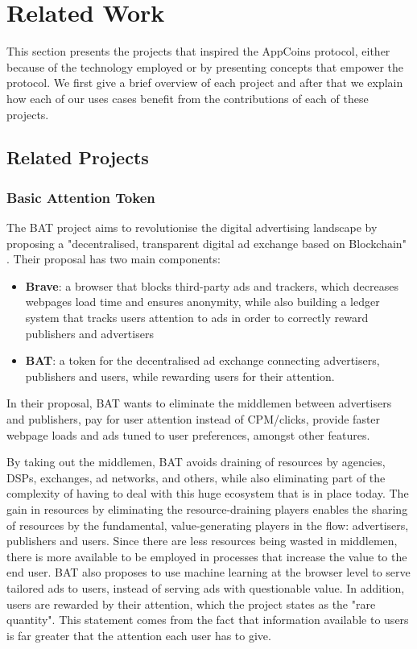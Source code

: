\section{Related Work}

\label{sec:related}

This section presents the projects that inspired the AppCoins protocol, either because of the technology employed or by presenting concepts that empower the protocol. We first give a brief overview of each project and after that we explain how each of our uses cases benefit from the contributions of each of these projects.

\subsection{Related Projects}

\subsubsection{Basic Attention Token}

The BAT project aims to revolutionise the digital advertising landscape by proposing a "decentralised, transparent digital ad exchange based on Blockchain" \cite{BAT}. Their proposal has two main components:

\begin{itemize}
	\item {\bf Brave}: a browser that blocks third-party ads and trackers, which decreases webpages load time and ensures anonymity, while also building a ledger system that tracks users attention to ads in order to correctly reward publishers and advertisers
	\item {\bf BAT}: a token for the decentralised ad exchange connecting advertisers, publishers and users, while rewarding users for their attention.
\end{itemize}

In their proposal, BAT wants to eliminate the middlemen between advertisers and publishers, pay for user attention instead of CPM/clicks, provide faster webpage loads and ads tuned to user preferences, amongst other features.

By taking out the middlemen, BAT avoids draining of resources by agencies, DSPs, exchanges, ad networks, and others, while also eliminating part of the complexity of having to deal with this huge ecosystem that is in place today. The gain in resources by eliminating the resource-draining players enables the sharing of resources by the fundamental, value-generating  players in the flow: advertisers, publishers and users. Since there are less resources being wasted in middlemen, there is more available to be employed in processes that increase the value to the end user. BAT also proposes to use machine learning at the browser level to serve tailored ads to users, instead of serving ads with questionable value. In addition, users are rewarded by their attention, which the project states as the "rare quantity". This statement comes from the fact that information available to users is far greater that the attention each user has to give.

